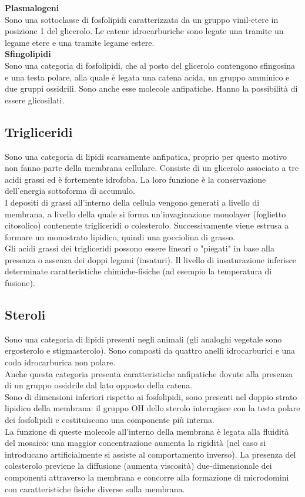             \textbf{Plasmalogeni}\\
                Sono una sottoclasse di fosfolipidi caratterizzata da un gruppo vinil-etere in posizione 1 del glicerolo. Le catene idrocarburiche sono legate una tramite un legame etere e una tramite legame estere.\\
            
            \textbf{Sfingolipidi}\\
                Sono una categoria di fosfolipidi, che al posto del glicerolo contengono sfingosina e una testa polare, alla quale è legata una catena acida, un gruppo amminico e due gruppi ossidrili. Sono anche esse molecole anfipatiche. Hanno la possibilità di essere glicosilati.
        
    \subsection{Trigliceridi}
        Sono una categoria di lipidi scarsamente anfipatica, proprio per questo motivo non fanno parte della membrana cellulare. Consiste di un glicerolo associato a tre acidi grassi ed è fortemente idrofoba. La loro funzione è la conservazione dell'energia sottoforma di accumulo.\\
        I depositi di grassi all'interno della cellula vengono generati a livello di membrana, a livello della quale si forma un'invaginazione monolayer (foglietto citosolico) contenente trigliceridi o colesterolo. Successivamente viene estrusa a formare un monostrato lipidico, quindi una gocciolina di grasso.\\
        Gli acidi grassi dei trigliceridi possono essere lineari o "piegati" in base alla presenza o assenza dei doppi legami (insaturi). Il livello di insaturazione inferisce determinate caratteristiche chimiche-fisiche (ad esempio la temperatura di fusione).
        
    \subsection{Steroli}
        Sono una categoria di lipidi presenti negli animali (gli analoghi vegetale sono ergosterolo e stigmasterolo).
        Sono composti da quattro anelli idrocarburici e una coda idrocarburica non polare.\\
        Anche questa categoria presenta caratteristiche anfipatiche dovute alla presenza di un gruppo ossidrile dal lato opposto della catena.\\
        Sono di dimensioni inferiori rispetto ai fosfolipidi, sono presenti nel doppio strato lipidico della membrana: il gruppo OH dello sterolo interagisce con la testa polare dei fosfolipidi e costituiscono una componente più interna.\\
        La funzione di queste molecole all'interno della membrana è legata alla fluidità del mosaico: una maggior concentrazione aumenta la rigidità (nel caso si introducano artificialmente si assiste al comportamento inverso). 
        La presenza del colesterolo previene la diffusione (aumenta viscosità) due-dimensionale dei componenti attraverso la membrana e concorre alla formazione di microdomini con caratteristiche fisiche diverse sulla membrana.
        
